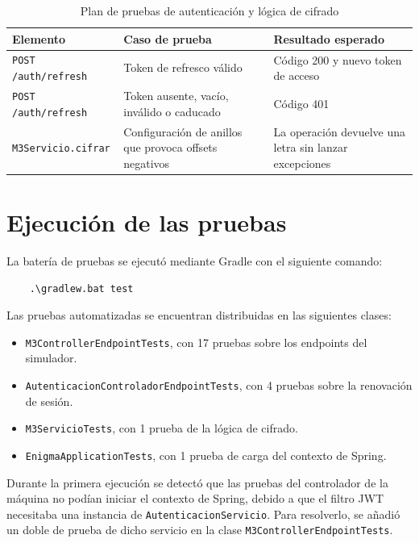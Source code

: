 \begin{table}[htbp]
	\centering
	\begin{tabular}{|p{4cm}|p{5cm}|p{3cm}|}
		\hline
		\textbf{Elemento} & \textbf{Caso de prueba} & \textbf{Resultado esperado} \\
		\hline
		\texttt{POST /auth/refresh} & Token de refresco válido & Código 200 y nuevo token de acceso \\
		\hline
		\texttt{POST /auth/refresh} & Token ausente, vacío, inválido o caducado & Código 401 \\
		\hline
		\texttt{M3Servicio.cifrar} & Configuración de anillos que provoca offsets negativos & La operación devuelve una letra sin lanzar excepciones \\
		\hline
	\end{tabular}
	\caption{Plan de pruebas de autenticación y lógica de cifrado}
	\label{tabla_pruebas_autenticacion}
\end{table}

\section{Ejecución de las pruebas}

La batería de pruebas se ejecutó mediante Gradle con el siguiente comando:

\begin{verbatim}
	.\gradlew.bat test
\end{verbatim}

Las pruebas automatizadas se encuentran distribuidas en las siguientes clases:

\begin{itemize}
	\item \texttt{M3ControllerEndpointTests}, con 17 pruebas sobre los endpoints del simulador.
	\item \texttt{AutenticacionControladorEndpointTests}, con 4 pruebas sobre la renovación de sesión.
	\item \texttt{M3ServicioTests}, con 1 prueba de la lógica de cifrado.
	\item \texttt{EnigmaApplicationTests}, con 1 prueba de carga del contexto de Spring.
\end{itemize}

Durante la primera ejecución se detectó que las pruebas del controlador de la máquina no podían iniciar el contexto de Spring, debido a que el filtro JWT necesitaba una instancia de \texttt{AutenticacionServicio}. Para resolverlo, se añadió un doble de prueba de dicho servicio en la clase \texttt{M3ControllerEndpointTests}.


